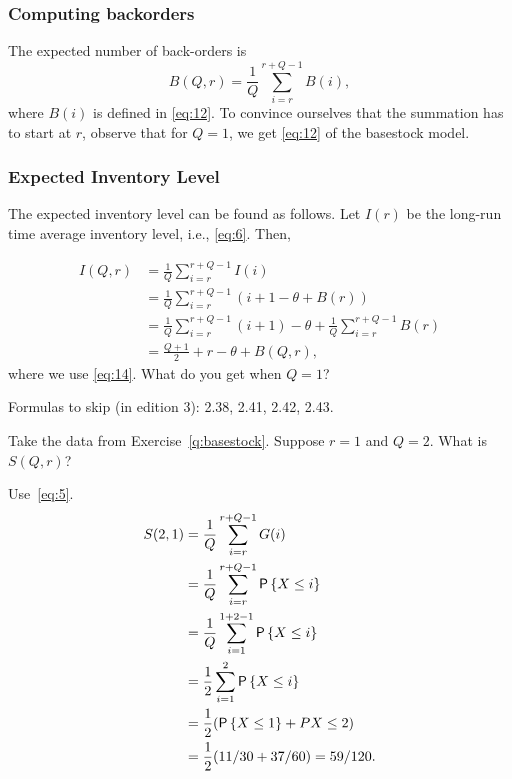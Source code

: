 \subsubsection{Computing  backorders}

The expected number of back-orders is 
\begin{equation}
  \label{eq:14}
   B(Q,r) = \frac1Q \sum_{i=r}^{r+Q-1} B(i),
\end{equation}
where $B(i)$ is defined in \eqref{eq:12}. To convince ourselves
that the summation has to start at $r$, observe that for
$Q=1$, we get \eqref{eq:12} of the basestock model.


\subsubsection{Expected Inventory Level}

The expected inventory level can be found as follows. Let $I(r)$
be the long-run time average inventory level, i.e., \eqref{eq:6}. Then,

\begin{equation}\label{eq:2}
  \begin{split}
   I(Q,r)
   &= \frac1Q\sum_{i=r}^{r+Q-1} I(i) \\
   &= \frac1Q\sum_{i=r}^{r+Q-1} (i+1 - \theta + B(r)) \\
   &= \frac1Q\sum_{i=r}^{r+Q-1} (i + 1)  - \theta + \frac1Q\sum_{i=r}^{r+Q-1} B(r) \\
   &= \frac{Q+1}2 + r - \theta + B(Q,r), 
  \end{split}
\end{equation}
where we use \eqref{eq:14}. What do you get when $Q=1$?

Formulas to skip (in edition 3): 2.38, 2.41, 2.42, 2.43.

\begin{question}
  Take the data from Exercise~\ref{q:basestock}. Suppose $r=1$ and $Q=2$. What is $S(Q,r)$?
\end{question}
\begin{solution}
  Use~\eqref{eq:5}.
  \begin{equation*}
    \begin{split}
      S(2,1)
&= \frac{1}Q\sum_{i=r}^{r+Q-1} G(i) \\
&= \frac{1}Q\sum_{i=r}^{r+Q-1} \P{X\leq i} \\
&= \frac{1}Q\sum_{i=1}^{1+2-1} \P{X\leq i} \\
&= \frac 12 \sum_{i=1}^{2} \P{X\leq i} \\
&=  \frac 12 (\P{X\leq 1} + P{X\leq 2}) \\
&= \frac12(11/30 + 37/60) = 59/120.
    \end{split}
  \end{equation*}
\end{solution}

